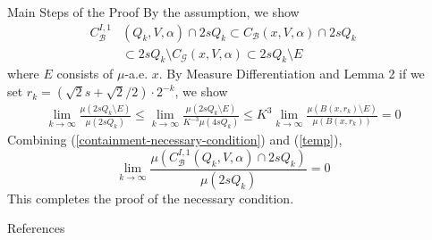 \documentclass[final]{beamer}
\newlength{\sepwidth}
\newlength{\colwidth}
\newcommand{\separatorcolumn}{\begin{column}{\sepwidth}\end{column}}
\newcommand{\calB}{\mathcal B}
\newcommand{\calG}{\mathcal G}
\begin{document}
\begin{frame}[t]
\begin{columns}[t]
\begin{column}{\colwidth}
\begin{block}{Main Steps of the Proof}
    By the assumption, we show
    \begin{equation}\label{containment-necessary-condition}
    \begin{split}
        C_\calB^{I,1}&(Q_k, V, \alpha) \cap 2sQ_k \subset C_\calB(x,V, \alpha) \cap 2sQ_k \\ & \subset 2sQ_k \setminus C_\calG(x, V, \alpha) \subset 2sQ_k \setminus E 
    \end{split}
    \end{equation}
    where $E$ consists of $\mu$-a.e. $x$. By Measure Differentiation \cite[Corollary 2.14]{mattila1999geometry} and Lemma {\color{violet}2} if we set $r_k = (\sqrt{2}s + \sqrt{2}/2) \cdot 2^{-k}$, we show
    {\small{
    \begin{equation}\label{temp}
        \begin{split}
            \lim_{k\rightarrow \infty} \frac{\mu(2sQ_k \setminus E)}{\mu(2sQ_k)} 
            \leq \lim_{k\rightarrow \infty} \frac{\mu(2sQ_k \setminus E)}{K^{-3}\mu(4sQ_k)} 
            \leq K^3 \lim_{k\rightarrow \infty} \frac{\mu(B(x, r_k) \setminus E)}{\mu(B(x, r_k))} = 
            0
        \end{split}
    \end{equation}
    }}
    Combining (\ref{containment-necessary-condition}) and (\ref{temp}),
    \begin{equation*}
        \lim_{k\rightarrow \infty}\frac{\mu(C_\calB^{I,1}(Q_k, V, \alpha)\cap 2sQ_k)}{\mu(2sQ_k)} =0
    \end{equation*}
    This completes the proof of the necessary condition. 
    \end{block}
    



  

  \begin{block}{References}

    \nocite{*}
    \footnotesize{}

  \end{block}


\end{column}

\separatorcolumn


\end{columns}
\end{frame}
\end{document}
